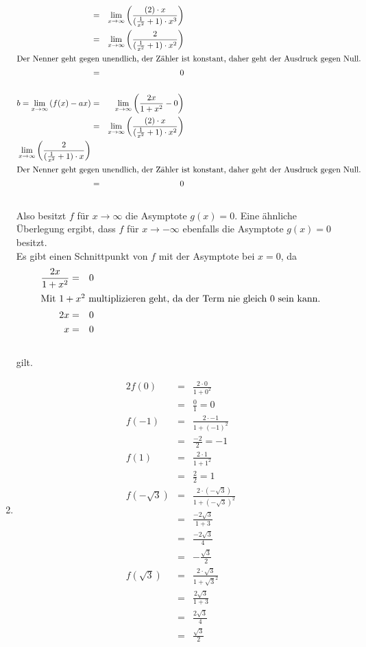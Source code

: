 \documentclass[10pt,a4paper,oneside,ngerman,numbers=noenddot]{scrartcl}
\begin{document}
\begin{enumerate}
\begin{alignat*}{2}
	&=& \lim_{x \rightarrow \infty} \left(\frac{(2) \cdot x}{(\frac{1}{x^{2}}+1) \cdot x^{3}} \right) \\
	&=& \lim_{x \rightarrow \infty} \left(\frac{2}{(\frac{1}{x^{2}}+1) \cdot x^{2}} \right) \\
	\intertext{Der Nenner geht gegen unendlich, der Zähler ist konstant, daher geht der Ausdruck gegen Null.}
	&=& 0\\
	\\
	b = \lim_{x \rightarrow \infty} \left( f(x) - ax \right) &=& \lim_{x \rightarrow \infty} \left( \frac{2x}{1+x^{2}} - 0 \right) \\
	&=& \lim_{x \rightarrow \infty} \left( \frac{(2) \cdot x}{(\frac{1}{x^{2}}+1) \cdot x^{2}} \right) \\
	\lim_{x \rightarrow \infty} \left( \frac{2}{(\frac{1}{x^{2}}+1) \cdot x} \right) \\
	\intertext{Der Nenner geht gegen unendlich, der Zähler ist konstant, daher geht der Ausdruck gegen Null.}
	&=& 0
	\end{alignat*}\\
	Also besitzt $f$ für $x \rightarrow \infty$ die Asymptote $g(x)=0$. Eine ähnliche Überlegung ergibt, dass $f$ für $x \rightarrow -\infty$ ebenfalls die Asymptote $g(x)=0$ besitzt.\\
	Es gibt einen Schnittpunkt von $f$ mit der Asymptote bei $x=0$, da\\
	\begin{alignat*}{2}
	\frac{2x}{1+x^{2}} &=& 0 \\
	\intertext{Mit $1+x^{2}$ multiplizieren geht, da der Term nie gleich 0 sein kann.}
	2x &=& 0 \\
	x &=& 0
	\end{alignat*}\\
	gilt.
	\item 
	\begin{alignat*}{2}
	f(0) &=& \frac{2 \cdot 0}{1 + 0^{2}} \\
	&=& \frac{0}{1} = 0\\
	f(-1) &=& \frac{2 \cdot -1}{1 + (-1)^{2}} \\
	&=& \frac{-2}{2} = -1 \\
	f(1) &=& \frac{2 \cdot 1}{1 + 1^{2}} \\
	&=& \frac{2}{2} = 1 \\
	f(-\sqrt{3}) &=& \frac{2 \cdot (-\sqrt{3})}{1 + (-\sqrt{3})^{2}} \\
	&=& \frac{-2\sqrt{3}}{1 + 3} \\
	&=& \frac{-2\sqrt{3}}{4} \\
	&=& -\frac{\sqrt{3}}{2} \\
	f(\sqrt{3}) &=& \frac{2 \cdot \sqrt{3}}{1 + \sqrt{3}^{2}} \\
	&=& \frac{2\sqrt{3}}{1 + 3} \\
	&=& \frac{2\sqrt{3}}{4} \\
	&=& \frac{\sqrt{3}}{2}
	\end{alignat*}
	

\end{enumerate}
\end{document}
